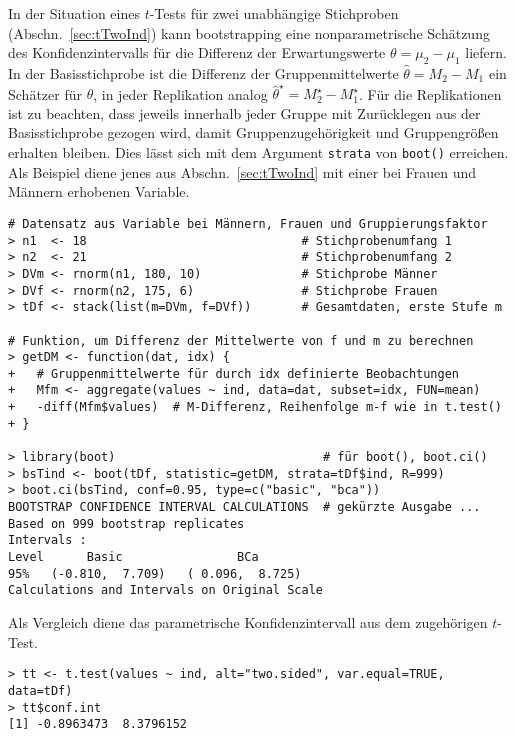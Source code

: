 In der Situation eines $t$-Tests für zwei unabhängige Stichproben (Abschn.\ \ref{sec:tTwoInd}) kann bootstrapping eine nonparametrische Schätzung des Konfidenzintervalls für die Differenz der Erwartungswerte $\theta = \mu_{2}-\mu_{1}$ liefern. In der Basisstichprobe ist die Differenz der Gruppenmittelwerte $\hat{\theta} = M_{2}-M_{1}$ ein Schätzer für $\theta$, in jeder Replikation analog $\hat{\theta}^{\star} = M_{2}^{\star}-M_{1}^{\star}$. Für die Replikationen ist zu beachten, dass jeweils innerhalb jeder Gruppe mit Zurücklegen aus der Basisstichprobe gezogen wird, damit Gruppenzugehörigkeit und Gruppengrößen erhalten bleiben. Dies lässt sich mit dem Argument \lstinline!strata! von \lstinline!boot()! erreichen. Als Beispiel diene jenes aus Abschn.\ \ref{sec:tTwoInd} mit einer bei Frauen und Männern erhobenen Variable.
\begin{lstlisting}
# Datensatz aus Variable bei Männern, Frauen und Gruppierungsfaktor
> n1  <- 18                              # Stichprobenumfang 1
> n2  <- 21                              # Stichprobenumfang 2
> DVm <- rnorm(n1, 180, 10)              # Stichprobe Männer
> DVf <- rnorm(n2, 175, 6)               # Stichprobe Frauen
> tDf <- stack(list(m=DVm, f=DVf))       # Gesamtdaten, erste Stufe m

# Funktion, um Differenz der Mittelwerte von f und m zu berechnen
> getDM <- function(dat, idx) {
+   # Gruppenmittelwerte für durch idx definierte Beobachtungen
+   Mfm <- aggregate(values ~ ind, data=dat, subset=idx, FUN=mean)
+   -diff(Mfm$values)  # M-Differenz, Reihenfolge m-f wie in t.test()
+ }

> library(boot)                             # für boot(), boot.ci()
> bsTind <- boot(tDf, statistic=getDM, strata=tDf$ind, R=999)
> boot.ci(bsTind, conf=0.95, type=c("basic", "bca"))
BOOTSTRAP CONFIDENCE INTERVAL CALCULATIONS  # gekürzte Ausgabe ...
Based on 999 bootstrap replicates
Intervals :
Level      Basic                BCa
95%   (-0.810,  7.709)   ( 0.096,  8.725)
Calculations and Intervals on Original Scale
\end{lstlisting}

Als Vergleich diene das parametrische Konfidenzintervall aus dem zugehörigen $t$-Test.
\begin{lstlisting}
> tt <- t.test(values ~ ind, alt="two.sided", var.equal=TRUE, data=tDf)
> tt$conf.int
[1] -0.8963473  8.3796152
\end{lstlisting}

